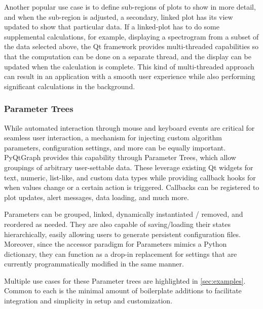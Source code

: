 \documentclass[journal]{vgtc}                %
\begin{document}
Another popular use case is to define sub-regions of plots to show in more detail, and when the sub-region is adjusted, a secondary, linked plot has its view updated to show that particular data.  If a linked-plot has to do some supplemental calculations, for example, displaying a spectrogram from a subset of the data selected above, the Qt framework provides multi-threaded capabilities so that the computation can be done on a separate thread, and the display can be updated when the calculation is complete.  This kind of multi-threaded approach can result in an application with a smooth user experience while also performing significant calculations in the background.

\subsubsection{Parameter Trees}\label{sec:paramtrees}
While automated interaction through mouse and keyboard events are critical for seamless user interaction, a mechanism for injecting custom algorithm parameters, configuration settings, and more can be equally important. PyQtGraph provides this capability through Parameter Trees, which allow groupings of arbitrary user-settable data. These leverage existing Qt widgets for text, numeric, list-like, and custom data types while providing callback hooks for when values change or a certain action is triggered. Callbacks can be registered to plot updates, alert messages, data loading, and much more.

Parameters can be grouped, linked, dynamically instantiated / removed, and reordered as needed. They are also capable of saving/loading their states hierarchically, easily allowing users to generate persistent configuration files. Moreover, since the accessor paradigm for Parameters mimics a Python dictionary, they can function as a drop-in replacement for settings that are currently programmatically modified in the same manner.

Multiple use cases for these Parameter trees are highlighted in \autoref{sec:examples}. Common to each is the minimal amount of boilerplate additions to facilitate integration and simplicity in setup and customization.

\end{document}

